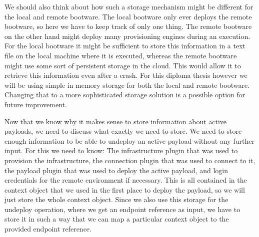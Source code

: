 We should also think about how such a storage mechanism might be different for the local and remote bootware.
The local bootware only ever deploys the remote bootware, so here we have to keep track of only one thing.
The remote bootware on the other hand might deploy many provisioning engines during an execution.
For the local bootware it might be sufficient to store this information in a text file on the local machine where it is executed, whereas the remote bootware might use some sort of persistent storage in the cloud.
This would allow it to retrieve this information even after a crash.
For this diploma thesis however we will be using simple in memory storage for both the local and remote bootware.
Changing that to a more sophisticated storage solution is a possible option for future improvement.

Now that we know why it makes sense to store information about active payloads, we need to discuss what exactly we need to store.
We need to store enough information to be able to undeploy an active payload without any further input.
For this we need to know: The infrastructure plugin that was used to provision the infrastructure, the connection plugin that was used to connect to it, the payload plugin that was used to deploy the active payload, and login credentials for the remote environment if necessary.
This is all contained in the context object that we used in the first place to deploy the payload, so we will just store the whole context object.
Since we also use this storage for the undeploy operation, where we get an endpoint reference as input, we have to store it in such a way that we can map a particular context object to the provided endpoint reference.
